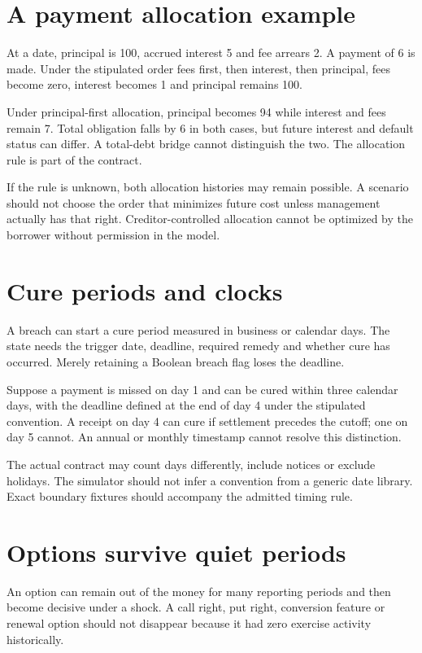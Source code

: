 \section{A payment allocation example}
At a date, principal is 100, accrued interest 5 and fee arrears 2. A payment of 6 is made. Under the stipulated order fees first, then interest, then principal, fees become zero, interest becomes 1 and principal remains 100.

Under principal-first allocation, principal becomes 94 while interest and fees remain 7. Total obligation falls by 6 in both cases, but future interest and default status can differ. A total-debt bridge cannot distinguish the two. The allocation rule is part of the contract.

If the rule is unknown, both allocation histories may remain possible. A scenario should not choose the order that minimizes future cost unless management actually has that right. Creditor-controlled allocation cannot be optimized by the borrower without permission in the model.

\section{Cure periods and clocks}
A breach can start a cure period measured in business or calendar days. The state needs the trigger date, deadline, required remedy and whether cure has occurred. Merely retaining a Boolean breach flag loses the deadline.

Suppose a payment is missed on day 1 and can be cured within three calendar days, with the deadline defined at the end of day 4 under the stipulated convention. A receipt on day 4 can cure if settlement precedes the cutoff; one on day 5 cannot. An annual or monthly timestamp cannot resolve this distinction.

The actual contract may count days differently, include notices or exclude holidays. The simulator should not infer a convention from a generic date library. Exact boundary fixtures should accompany the admitted timing rule.

\section{Options survive quiet periods}
An option can remain out of the money for many reporting periods and then become decisive under a shock. A call right, put right, conversion feature or renewal option should not disappear because it had zero exercise activity historically.


